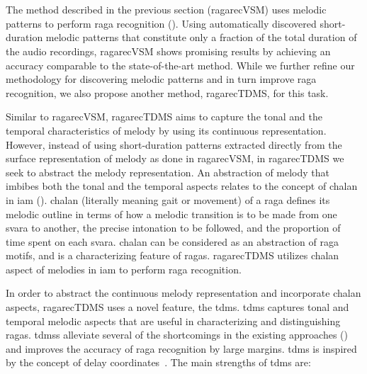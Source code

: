 \section{}
\label{sec:tdms_raga_recognition}

The method described in the previous section (\acrshort{ragarecVSM}) uses melodic patterns to perform \gls{raga} recognition (). Using automatically discovered short-duration melodic patterns that constitute only a fraction of the total duration of the audio recordings, \acrshort{ragarecVSM} shows promising results by achieving an accuracy comparable to the state-of-the-art method. While we further refine our methodology for discovering melodic patterns and in turn improve \gls{raga} recognition, we also propose another method, \acrshort{ragarecTDMS}, for this task. 

Similar to \acrshort{ragarecVSM}, \acrshort{ragarecTDMS} aims to capture the tonal and the temporal characteristics of melody by using its continuous representation. However, instead of using short-duration patterns extracted directly from the surface representation of melody as done in \acrshort{ragarecVSM}, in \acrshort{ragarecTDMS} we seek to abstract the melody representation. An abstraction of melody that imbibes both the tonal and the temporal aspects relates to the concept of \gls{chalan} in \gls{iam} (). \Gls{chalan} (literally meaning gait or movement) of a \gls{raga} defines its melodic outline in terms of how a melodic transition is to be made from one \gls{svara} to another, the precise intonation to be followed, and the proportion of time spent on each \gls{svara}. \Gls{chalan} can be considered as an abstraction of \gls{raga} motifs, and is a characterizing feature of \glspl{raga}. \acrshort{ragarecTDMS} utilizes \gls{chalan} aspect of melodies in \gls{iam} to perform \gls{raga} recognition.

In order to abstract the continuous melody representation and incorporate \gls{chalan} aspects, \acrshort{ragarecTDMS} uses a novel feature,  the \acrfull{tdms}. \gls{tdms} captures tonal and temporal melodic aspects that are useful in characterizing and distinguishing \glspl{raga}. \Glspl{tdms} alleviate several of the shortcomings in the existing approaches () and improves the accuracy of \gls{raga} recognition by large margins. \Gls{tdms} is inspired by the concept of delay coordinates~\citep{takens1981detecting}. The main strengths of \gls{tdms} are:

